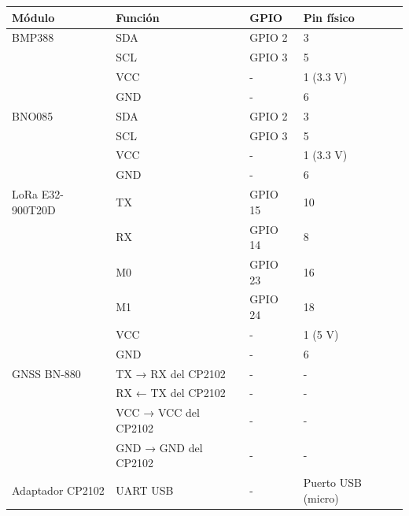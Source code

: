 \begin{table}[H]
    \centering
    \begin{tabular}{|l|l|l|l|}
        \hline
        \textbf{Módulo}     & \textbf{Función}     & \textbf{GPIO} & \textbf{Pin físico} \\ \hline
        BMP388              & SDA                  & GPIO 2        & 3                   \\ \cline{2-4}
        & SCL                  & GPIO 3        & 5                   \\ \cline{2-4}
        & VCC                  & -             & 1 (3.3 V)           \\ \cline{2-4}
        & GND                  & -             & 6                   \\ \hline
        BNO085              & SDA                  & GPIO 2        & 3                   \\ \cline{2-4}
        & SCL                  & GPIO 3        & 5                   \\ \cline{2-4}
        & VCC                  & -             & 1 (3.3 V)           \\ \cline{2-4}
        & GND                  & -             & 6                   \\ \hline
        LoRa E32-900T20D    & TX                   & GPIO 15       & 10                  \\ \cline{2-4}
        & RX                   & GPIO 14       & 8                   \\ \cline{2-4}
        & M0                   & GPIO 23       & 16                  \\ \cline{2-4}
        & M1                   & GPIO 24       & 18                  \\ \cline{2-4}
        & VCC                  & -             & 1 (5 V)             \\ \cline{2-4}
        & GND                  & -             & 6                   \\ \hline
        GNSS BN-880         & TX → RX del CP2102   & -             & -                   \\ \cline{2-4}
        & RX ← TX del CP2102   & -             & -                   \\ \cline{2-4}
        & VCC → VCC del CP2102 & -             & -                   \\ \cline{2-4}
        & GND → GND del CP2102 & -             & -                   \\ \hline
        Adaptador CP2102    & UART USB             & -             & Puerto USB (micro)  \\ \hline

\end{tabular}
\end{table}
